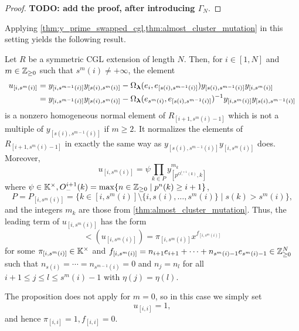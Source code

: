 \begin{proof}
	\textbf{TODO: add the proof, after introducing $\Gamma_N$}.
\end{proof}

Applying \cref{thm:y_prime_swapped_cgl,thm:almost_cluster_mutation} in this setting
yields the following result.
\begin{proposition}\label{prop:def_u_brackets}
	Let $R$ be a symmetric CGL extension of length $N$. Then, for $i\in [1, N]$ and $m \in \mathbb{Z}_{\geq 0}$ such that $s^m(i) \neq + \infty$, the element
	\begin{align*}
		u_{[i, s^m(i)]} & = y_{[i, s^{m-1}(i)]}y_{[s(i), s^m(i)]} - \Omega_{\boldsymbol{\lambda}}(e_i, e_{[s(i), s^{m-1}(i)]})y_{[s(i), s^{m-1}(i)]}y_{[i, s^m(i)]}             \\
		                & = y_{[i, s^{m-1}(i)]}y_{[s(i), s^m(i)]} - \Omega_{\boldsymbol{\lambda}}(e_{s^m(i)}, e_{[s(i), s^{m-1}(i)]})^{-1} y_{[i, s^m(i)]}y_{[s(i), s^{m-1}(i)]}
	\end{align*}
	is a nonzero homogeneous normal element of $R_{[i+1, s^m(i) - 1]}$ which is not a
	multiple of $y_{[s(i), s^{m-1}(i)]}$ if $m \geq 2$. It normalizes the elements of
	$R_{[i+1, s^m(i) - 1]}$ in exactly the same way as $y_{[s(i),
						s^{m-1}(i)]}y_{[i,s^m(i)]}$ does. Moreover,
	\begin{equation*}
		u_{[i, s^m(i)]} = \psi \prod_{k \in P} y^{m_k}_{[p^{O_{-}^{i+1}(k)}, k]}
	\end{equation*}
	where $\psi \in \mathbb{K}^\times, O^{i+1}_{-}(k) = \max\{n \in \mathbb{Z}_{\geq 0} \mid p^n(k) \geq i + 1\}$,
	\begin{equation*}
		P = P_{[i,s^m (i)]} = \{k \in [i, s^m(i)]\setminus \{i, s(i), \dots, s^m(i)\} \mid s(k) > s^m(i)\},
	\end{equation*}
	and the integers $m_k$ are those from \cref{thm:almost_cluster_mutation}. Thus, the
	leading term of $u_{[i, s^m(i)]}$ has the form
	\begin{equation*}
		\lt (u_{[i, s^m(i)]}) = \pi_{[i, s^m(i)]} x^{f_{[i, s^m(i)]}}
	\end{equation*}
	for some $\pi_{[i, s^m(i)]} \in \mathbb{K}^\times$ and $f_{[i, s^m(i)]} = n_{i+1}e_{i+1} +
		\cdots + n_{s^m(i) -1}e_{s^m(i)-1} \in \mathbb{Z}_{\geq 0}^N$ such that $n_{s(i)} = \cdots =
		n_{s^{m-1}(i)} = 0$ and $n_j = n_l$ for all $i+1 \leq j \leq l \leq s^m(i)-1$ with
	$\eta(j) = \eta(l)$.
\end{proposition}

The proposition does not apply for $m = 0$, so in this case we simply set
\begin{equation*}
	u_{[i, i]} = 1,
\end{equation*}
and hence $\pi_{[i,i]} = 1, f_{[i,i]} = 0$.

